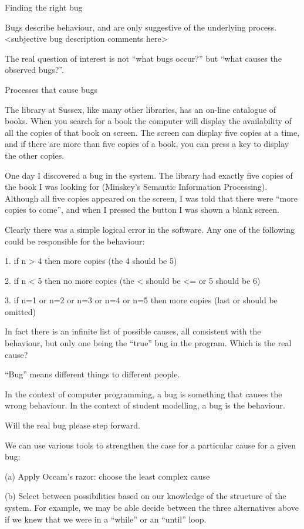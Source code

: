 
Finding the right bug

Bugs describe behaviour, and are only suggestive of the underlying
process.
<subjective bug description comments here>

The real question of interest is not ``what bugs occur?'' but ``what
causes the observed bugs?''.

Processes that cause bugs

The library at Sussex, like many other libraries, has an on-line catalogue
of books.  When you search for a book the computer will display the
availability of all the copies of that book on screen.  The screen can
display five copies at a time, and if there are more than five copies of a
book, you can press a key to display the other copies.

One day I discovered a bug in the system.  The library had exactly five
copies of the book I was looking for (Minskey's Semantic Information
Processing). Although all five copies appeared on the screen, I was told
that there were ``more copies to come'', and when I pressed the button I
was shown a blank screen.

Clearly there was a simple logical error in the software.  Any one of the
following could be responsible for the behaviour:

  1.  if n > 4 then more copies       (the 4 should be 5)

  2.  if n < 5 then no more copies    (the < should be <= or 5 should be 6)

  3.  if n=1 or n=2 or n=3 or n=4 or
        n=5 then more copies        (last or should be omitted)

In fact there is an infinite list of possible causes, all consistent with
the behaviour, but only one being the ``true'' bug in the program.  Which
is the real cause?


``Bug'' means different things to different people.

In the context of computer programming, a bug is something that causes the
wrong behaviour.  In the context of student modelling, a bug is the
behaviour.


Will the real bug please step forward.

We can use various tools to strengthen the case for a particular
cause for a given bug:

    (a) Apply Occam's razor: choose the least complex cause

    (b) Select between possibilities based on our knowledge of the
        structure of the system. For example, we may be able decide between
        the three alternatives above if we knew that we were in a ``while''
        or an ``until'' loop.

